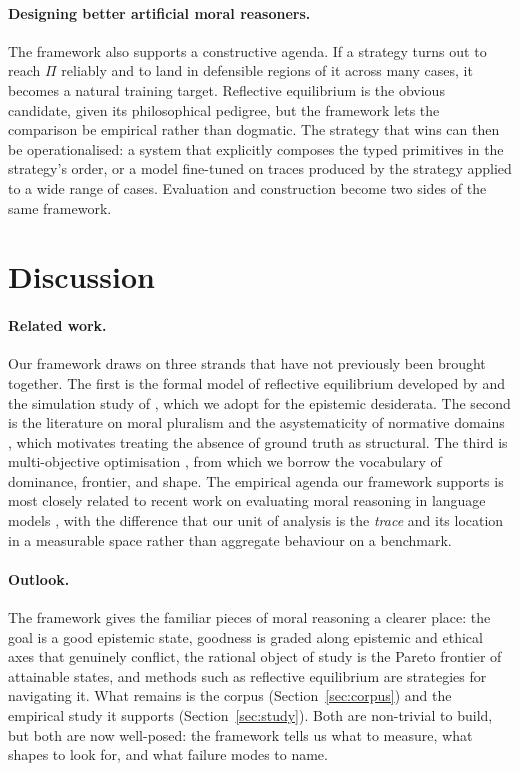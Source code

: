 \documentclass{article}
\begin{document}
\paragraph{Designing better artificial moral reasoners.} The framework
also supports a constructive agenda. If a strategy turns out to reach
$\Pi$ reliably and to land in defensible regions of it across many
cases, it becomes a natural training target. Reflective equilibrium is
the obvious candidate, given its philosophical pedigree, but the
framework lets the comparison be empirical rather than dogmatic. The
strategy that wins can then be operationalised: a system that explicitly
composes the typed primitives in the strategy's order, or a model
fine-tuned on traces produced by the strategy applied to a wide range of
cases. Evaluation and construction become two sides of the same
framework.


\section{Discussion}
\label{sec:discussion}

\paragraph{Related work.} Our framework draws on three strands that have
not previously been brought together. The first is the formal model of
reflective equilibrium developed by \citet{beisbart2021} and the
simulation study of \citet{freivogel2023}, which we adopt for the epistemic
desiderata. The second is the literature on moral pluralism and the
asystematicity of normative domains \citep{queloz2025,elgin1996}, which
motivates treating the absence of ground truth as structural. The third is
multi-objective optimisation \citep{deb2001multiobjective}, from which we
borrow the vocabulary of dominance, frontier, and shape. The empirical
agenda our framework supports is most closely related to recent work on
evaluating moral reasoning in language models
\citep{haas2026,awad2022computational}, with the difference that our unit of
analysis is the \emph{trace} and its location in a measurable space rather
than aggregate behaviour on a benchmark.

\paragraph{Outlook.} The framework gives the familiar pieces of moral
reasoning a clearer place: the goal is a good epistemic state, goodness is
graded along epistemic and ethical axes that genuinely conflict, the
rational object of study is the Pareto frontier of attainable states, and
methods such as reflective equilibrium are strategies for navigating it.
What remains is the corpus (Section~\ref{sec:corpus}) and the empirical
study it supports (Section~\ref{sec:study}). Both are non-trivial to build,
but both are now well-posed: the framework tells us what to measure, what
shapes to look for, and what failure modes to name.
\end{document}
